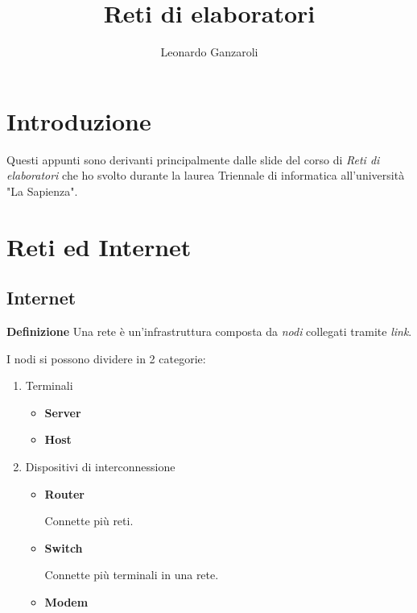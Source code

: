 \documentclass{article}
\title{Reti di elaboratori}
\author{Leonardo Ganzaroli}
\date{}
\begin{document}
\maketitle


\tableofcontents

\hypersetup{allcolors=black}

\newpage

\section*{Introduzione}

Questi appunti sono derivanti principalmente dalle slide del corso di \textit{Reti di elaboratori} che ho svolto durante la laurea Triennale di informatica all'università "La Sapienza".

\newpage

\section{Reti ed Internet}

\subsection{Internet}

\textbf{Definizione} Una rete è un'infrastruttura composta da \textit{nodi} collegati tramite \textit{link}.\newline

\noindent I nodi si possono dividere in 2 categorie:
\begin{enumerate}
    \item Terminali
        \begin{itemize}
            \item \textbf{Server}
            \item \textbf{Host}
        \end{itemize}
    \item Dispositivi di interconnessione
        \begin{itemize}
            \item \textbf{Router}

                Connette più reti.
            
            \item \textbf{Switch}

                Connette più terminali in una rete.
            
            \item \textbf{Modem}\newline
        \end{itemize}
\end{enumerate}
\end{document}
